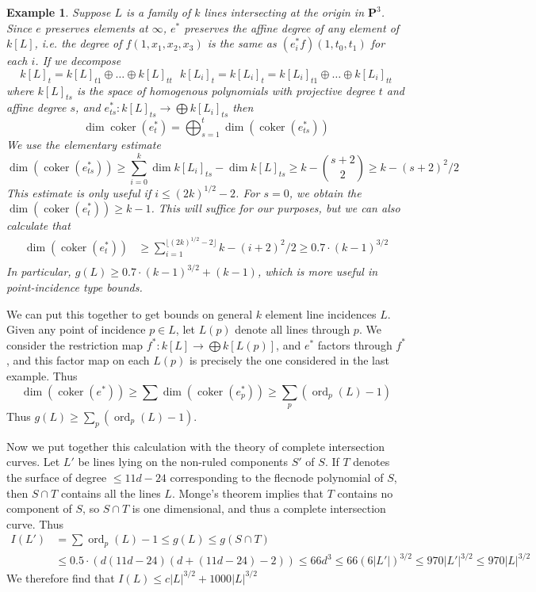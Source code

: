 \documentclass{article}
\theoremstyle{plain}
\newtheorem*{example}{Example}
\DeclareMathOperator{\ord}{\text{ord}}
\DeclareMathOperator{\coker}{\text{coker}}
\begin{document}
\begin{example}
    Suppose $L$ is a family of $k$ lines intersecting at the origin in $\mathbf{P}^3$. Since $e$ preserves elements at $\infty$, $e^*$ preserves the affine degree of any element of $k[L]$, i.e. the degree of $f(1,x_1,x_2,x_3)$ is the same as $(e^*_i f)(1,t_0,t_1)$ for each $i$. If we decompose
    \[ k[L]_t = k[L]_{t1} \oplus \dots \oplus k[L]_{tt}\ \ \ k[L_i]_t = k[L_i]_t = k[L_i]_{t1} \oplus \dots \oplus k[L_i]_{tt} \]
    where $k[L]_{ts}$ is the space of homogenous polynomials with projective degree $t$ and affine degree $s$, and $e_{ts}^*: k[L]_{ts} \to \bigoplus k[L_i]_{ts}$ then
    \[ \dim \coker(e_t^*) = \bigoplus_{s = 1}^t \dim ( \coker(e_{ts}^*)) \]
    We use the elementary estimate
    \[ \dim ( \coker(e_{ts}^* )) \geq \sum_{i = 0}^k \dim k[L_i]_{ts} - \dim k[L]_{ts} \geq k -  {s+2 \choose 2} \geq k - (s+2)^2/2 \]
    This estimate is only useful if $i \leq (2k)^{1/2} - 2$. For $s = 0$, we obtain the $\dim(\coker(e_t^*)) \geq k-1$. This will suffice for our purposes, but we can also calculate that
    \begin{align*}
        \dim(\coker(e_t^*)) &\geq \sum_{i = 1}^{\lfloor (2k)^{1/2} - 2 \rfloor} k - (i+2)^2/2 \geq 0.7 \cdot (k-1)^{3/2}\\
    \end{align*}
    In particular, $g(L) \geq 0.7 \cdot (k-1)^{3/2} + (k-1)$, which is more useful in point-incidence type bounds.
\end{example}

We can put this together to get bounds on general $k$ element line incidences $L$. Given any point of incidence $p \in L$, let $L(p)$ denote all lines through $p$. We consider the restriction map $f^*: k[L] \to \bigoplus k[L(p)]$, and $e^*$ factors through $f^*$, and this factor map on each $L(p)$ is precisely the one considered in the last example. Thus
%
\[ \dim(\coker(e^*)) \geq \sum \dim(\coker(e^*_p)) \geq \sum_p (\ord_p(L) - 1) \]
%
%
Thus $g(L) \geq \sum_p (\ord_p(L) - 1)$.

Now we put together this calculation with the theory of complete intersection curves. Let $L'$ be lines lying on the non-ruled components $S'$ of $S$. If $T$ denotes the surface of degree $\leq 11d - 24$ corresponding to the flecnode polynomial of $S$, then $S \cap T$ contains all the lines $L$. Monge's theorem implies that $T$ contains no component of $S$, so $S \cap T$ is one dimensional, and thus a complete intersection curve. Thus
%
\begin{align*}
    I(L') &= \sum \ord_p(L) - 1 \leq g(L) \leq g(S \cap T)\\
    &\leq 0.5 \cdot (d(11d - 24)(d + (11d - 24) - 2)) \leq 66d^3 \leq 66(6|L'|)^{3/2} \leq 970 |L'|^{3/2} \leq 970 |L|^{3/2}
\end{align*}
%
We therefore find that $I(L) \leq c |L|^{3/2} + 1000 |L|^{3/2}$

\end{document}
